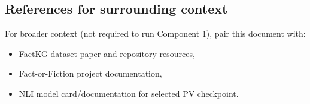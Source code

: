 \subsection{References for surrounding context}
For broader context (not required to run Component 1), pair this document with:
\begin{itemize}
\item FactKG dataset paper and repository resources,
\item Fact-or-Fiction project documentation,
\item NLI model card/documentation for selected PV checkpoint.
\end{itemize}
